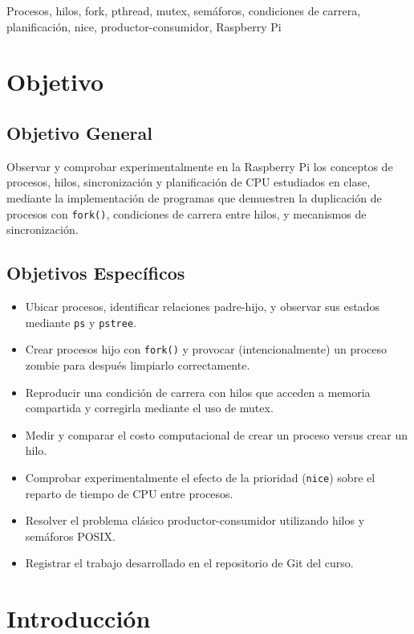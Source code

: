 \documentclass[conference]{IEEEtran}
\begin{document}
\begin{IEEEkeywords}
	Procesos, hilos, fork, pthread, mutex, semáforos, condiciones de carrera, planificación, nice, productor-consumidor, Raspberry Pi
\end{IEEEkeywords}

\section{Objetivo}

\subsection{Objetivo General}
Observar y comprobar experimentalmente en la Raspberry Pi los conceptos de procesos, hilos, sincronización y planificación de CPU estudiados en clase, mediante la implementación de programas que demuestren la duplicación de procesos con \texttt{fork()}, condiciones de carrera entre hilos, y mecanismos de sincronización.

\subsection{Objetivos Específicos}
\begin{itemize}
	\item Ubicar procesos, identificar relaciones padre-hijo, y observar sus estados mediante \texttt{ps} y \texttt{pstree}.
	\item Crear procesos hijo con \texttt{fork()} y provocar (intencionalmente) un proceso zombie para después limpiarlo correctamente.
	\item Reproducir una condición de carrera con hilos que acceden a memoria compartida y corregirla mediante el uso de mutex.
	\item Medir y comparar el costo computacional de crear un proceso versus crear un hilo.
	\item Comprobar experimentalmente el efecto de la prioridad (\texttt{nice}) sobre el reparto de tiempo de CPU entre procesos.
	\item Resolver el problema clásico productor-consumidor utilizando hilos y semáforos POSIX.
	\item Registrar el trabajo desarrollado en el repositorio de Git del curso.
\end{itemize}

\section{Introducción}
\end{document}
